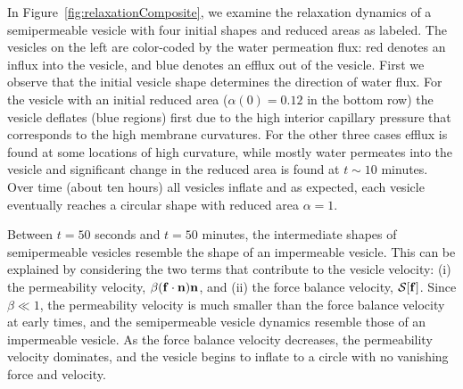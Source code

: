 \documentclass[9pt,twocolumn,twoside,lineno]{pnas-new}
\begin{document}
In Figure~\ref{fig:relaxationComposite}, we examine the relaxation
dynamics of a semipermeable vesicle with four initial shapes and reduced
areas as labeled. The vesicles on the left are color-coded by the water
permeation flux: red denotes an influx into the vesicle, and blue
denotes an efflux out of the vesicle.
%
First we observe that the initial vesicle shape determines the direction
of water flux. For the vesicle with an initial reduced area
($\alpha(0)=0.12$ in the bottom row) the vesicle deflates (blue regions)
first due to the high interior capillary pressure that corresponds to
the high membrane curvatures. For the other three cases efflux is found
at some locations of high curvature, while mostly water permeates into
the vesicle and significant change in the reduced area is found at
$t\sim 10$ minutes. Over time (about ten hours) all vesicles inflate and
as expected, each vesicle eventually reaches a circular shape with
reduced area $\alpha=1$. 
%
%

Between $t=50$ seconds and $t=50$ minutes, the intermediate shapes of
semipermeable vesicles resemble the shape of an impermeable vesicle.
This can be explained by considering the two terms that contribute to
the vesicle velocity: (i) the permeability velocity, $\beta(\mathbf{f} \cdot
\mathbf{n}) \mathbf{n}$, and (ii) the force balance velocity, $\mathcal{S}[\mathbf{f}]$. Since
$\beta\ll 1$, the permeability velocity is much smaller than the force
balance velocity at early times, and the semipermeable vesicle dynamics
resemble those of an impermeable vesicle. As the force balance velocity
decreases, the permeability velocity dominates, and the vesicle begins
to inflate to a circle with no vanishing force and velocity. 


\end{document}
